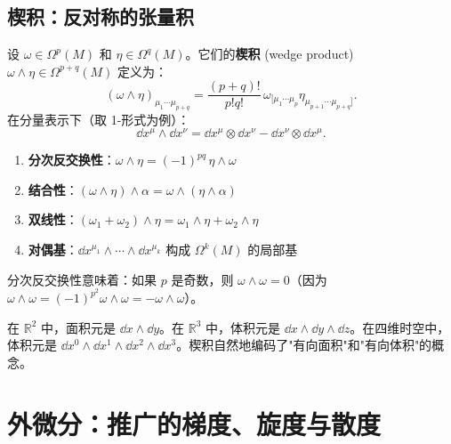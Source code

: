\subsection{楔积：反对称的张量积}

\begin{definition}[楔积]
设 $\omega \in \Omega^p(M)$ 和 $\eta \in \Omega^q(M)$。它们的\textbf{楔积} (wedge product) $\omega \wedge \eta \in \Omega^{p+q}(M)$ 定义为：
\begin{equation}
    (\omega \wedge \eta)_{\mu_1\cdots\mu_{p+q}} = \frac{(p+q)!}{p!q!} \, \omega_{[\mu_1\cdots\mu_p} \eta_{\mu_{p+1}\cdots\mu_{p+q}]}.
\end{equation}
在分量表示下（取 1-形式为例）：
\begin{equation}
    \dd x^\mu \wedge \dd x^\nu = \dd x^\mu \otimes \dd x^\nu - \dd x^\nu \otimes \dd x^\mu.
\end{equation}
\end{definition}

\begin{property}[楔积的性质]
\begin{enumerate}
    \item \textbf{分次反交换性}：$\omega \wedge \eta = (-1)^{pq} \, \eta \wedge \omega$
    \item \textbf{结合性}：$(\omega \wedge \eta) \wedge \alpha = \omega \wedge (\eta \wedge \alpha)$
    \item \textbf{双线性}：$(\omega_1 + \omega_2) \wedge \eta = \omega_1 \wedge \eta + \omega_2 \wedge \eta$
    \item \textbf{对偶基}：$\dd x^{\mu_1} \wedge \cdots \wedge \dd x^{\mu_k}$ 构成 $\Omega^k(M)$ 的局部基
\end{enumerate}
分次反交换性意味着：如果 $p$ 是奇数，则 $\omega \wedge \omega = 0$（因为 $\omega \wedge \omega = (-1)^{p^2} \omega \wedge \omega = -\omega \wedge \omega$）。
\end{property}

在 $\mathbb{R}^2$ 中，面积元是 $\dd x \wedge \dd y$。在 $\mathbb{R}^3$ 中，体积元是 $\dd x \wedge \dd y \wedge \dd z$。在四维时空中，体积元是 $\dd x^0 \wedge \dd x^1 \wedge \dd x^2 \wedge \dd x^3$。楔积自然地编码了"有向面积"和"有向体积"的概念。

\section{外微分：推广的梯度、旋度与散度}

